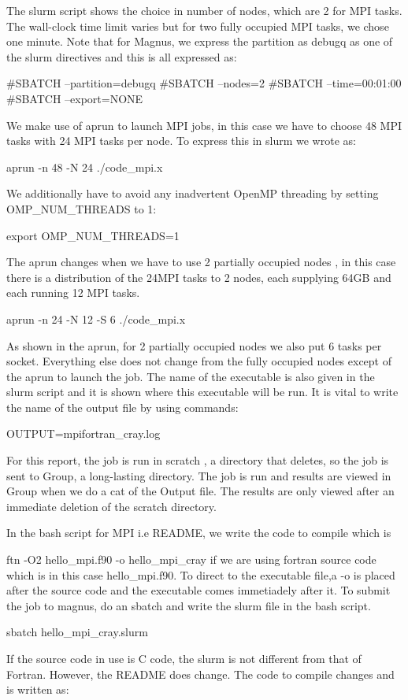 \begin{Document}
{The slurm script shows the choice in number of nodes, which are 2 for MPI tasks. The wall-clock time limit varies but for two fully occupied MPI tasks, we chose one minute.
Note that for Magnus, we express the partition as debugq as one of the slurm directives and this is all expressed as:

#SBATCH --partition=debugq
#SBATCH --nodes=2
#SBATCH --time=00:01:00
#SBATCH --export=NONE

We make use of aprun to launch MPI jobs, in this case we have to choose 48 MPI tasks with 24 MPI tasks per node.
To express this in slurm we wrote as:

aprun -n 48 -N 24 ./code_mpi.x

We additionally have to avoid any inadvertent OpenMP threading by setting OMP_NUM_THREADS to 1:

export OMP_NUM_THREADS=1

The aprun changes when we have to use 2 partially occupied nodes , in this case there is a distribution of the 24MPI tasks to 2 nodes, each supplying 64GB and each running 12 MPI tasks.

aprun -n 24 -N 12 -S 6 ./code_mpi.x

As shown in the aprun, for 2 partially occupied nodes we also put 6 tasks per socket.
Everything else does not change from the fully occupied nodes except of the aprun to launch the job.
The name of the executable is also given in the slurm script and it is shown where this executable will be run.
It is vital to write the name of the output file by using commands:

OUTPUT=mpifortran_cray.log
 
For this report, the job is run in scratch , a directory that deletes, so the job is sent to Group, a long-lasting directory. 
The job is run and results are viewed in Group when we do a cat of the Output file. 
The results are only viewed  after an immediate deletion of the scratch directory.

In the bash script for MPI i.e README, we write the code to compile which is 

ftn -O2 hello_mpi.f90 -o hello_mpi_cray if we are using fortran source code which is in this case hello_mpi.f90. To direct to the executable file,a -o is placed after the source code and the executable comes immetiadely after it.
To submit the job to magnus, do an sbatch and write the slurm file in the bash script.

sbatch hello_mpi_cray.slurm

If the source code in use is C code, the slurm is not different from that of Fortran. However, the README does change. 
The code to compile changes and is written as:

}
\end{Document}
